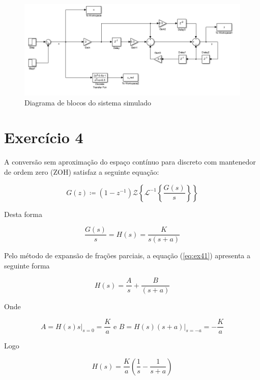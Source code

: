 \documentclass{article}
\begin{document}
\begin{figure}[!h]
	\center
	\includegraphics[width=\textwidth]{./images/ex3simulink.png}
	\caption{Diagrama de blocos do sistema simulado}
	\label{fig:ex3diag}
\end{figure}

\section*{Exercício 4}

A conversão sem aproximação do espaço contínuo para discreto com mantenedor de ordem zero (ZOH) satisfaz a seguinte equação:

\begin{equation}
G(z) \coloneqq (1-z^{-1}) \mathcal{Z}\left\{\mathcal{L}^{-1}\left\{\frac{G(s)}{s}\right\}\right\}
\end{equation}

Desta forma

\begin{equation}
\label{eq:ex41}
\frac{G(s)}{s} = H(s) = \frac{K}{s(s+a)}
\end{equation}

Pelo método de expansão de frações parciais, a equação (\ref{eq:ex41}) apresenta a seguinte forma

\begin{equation}
H(s) = \frac{A}{s} + \frac{B}{(s+a)} 
\end{equation}

Onde 

\begin{equation}
A = H(s) s \bigg\rvert_{s=0} = \frac{K}{a} \mbox{ e } B = H(s) (s+a)\bigg\rvert_{s=-a} = -\frac{K}{a}
\end{equation}

Logo

\begin{equation}
H(s) = \frac{K}{a} \left( \frac{1}{s} - \frac{1}{s+a} \right)
\end{equation}
\end{document}
